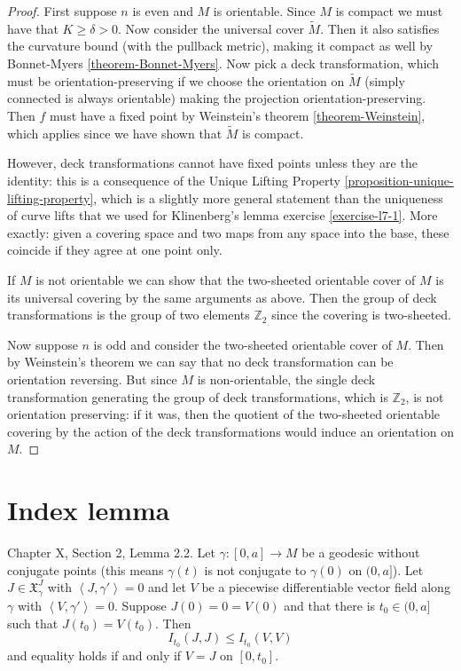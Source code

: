 \begin{proof}
First suppose $n$ is even and $M$ is orientable. Since $M$ is compact we must
have that $K\geq \delta>0$. Now consider the universal cover $\tilde{M}$. Then
it also satisfies the curvature bound (with the pullback metric), 
making it compact as well by Bonnet-Myers \ref{theorem-Bonnet-Myers}. 
Now pick a deck transformation, which must be
orientation-preserving if we choose the orientation on $\tilde{M}$ (simply
connected is always orientable) making the projection orientation-preserving.
Then $f$ must have a fixed point by Weinstein's theorem \ref{theorem-Weinstein},
which applies since we have shown that $\tilde{M}$ is compact. 

However, deck transformations cannot have fixed points unless they are the 
identity: this is a consequence of the Unique Lifting Property
 \ref{proposition-unique-lifting-property}, which is a 
slightly more general statement than the uniqueness of curve lifts that we 
used for Klinenberg's lemma exercise \ref{exercise-l7-1}. 
More exactly: given a covering space and two maps from any space into the base, 
these coincide if they agree at one point only.

If $M$ is not orientable we can show that the two-sheeted orientable cover of
$M$ is its universal covering by the same arguments as above. Then the group of
deck transformations is the group of two elements $\mathbb{Z}_2$ since the
covering is two-sheeted.

Now suppose $n$ is odd and consider the two-sheeted orientable cover of $M$.
Then by Weinstein's theorem we can say that no deck transformation can be
orientation reversing. But since $M$ is non-orientable, the single deck
transformation generating the group of deck transformations, which is
$\mathbb{Z}_2$, is not orientation preserving: if it was, then the quotient of
the two-sheeted orientable covering by the action of the deck transformations
would induce an orientation on $M$.
\end{proof}

\section{Index lemma}
\label{section-index-lemma}

\begin{lemma}[Index]
\label{lemma-index}
\cite{doc} Chapter X, Section 2, Lemma 2.2. Let $\gamma:[0,a]\to M$ be a
geodesic without conjugate points (this means $\gamma(t)$ is not conjugate to
$\gamma(0)$ on $(0,a]$). Let $J\in\mathfrak{X}_\gamma^J$ with
$\left<J,\gamma'\right>=0$ and let $V$ be a piecewise differentiable vector
field along $\gamma$ with $\left<V,\gamma'\right>=0$. Suppose $J(0)=0=V(0)$ and
that there is  $t_0\in(0,a]$ such that $J(t_0)=V(t_0)$. Then
$$
I_{t_0}(J,J)\leq I_{t_0}(V,V)
$$
and equality holds if and only if $V=J$ on $[0,t_0]$.
\end{lemma}

